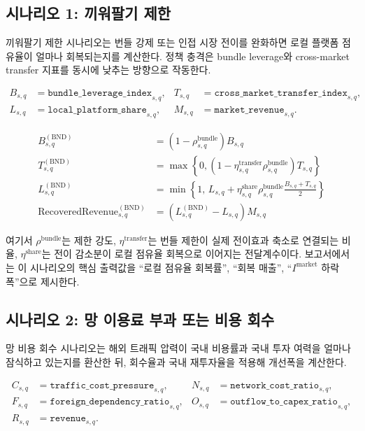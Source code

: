 \documentclass[11pt,a4paper]{report}
\begin{document}
\subsection{시나리오 1: 끼워팔기 제한}
끼워팔기 제한 시나리오는 번들 강제 또는 인접 시장 전이를 완화하면 로컬 플랫폼 점유율이 얼마나 회복되는지를 계산한다. 정책 충격은 bundle leverage와 cross-market transfer 지표를 동시에 낮추는 방향으로 작동한다.

\[
\begin{aligned}
B_{s,q} &= \texttt{bundle\_leverage\_index}_{s,q}, &
T_{s,q} &= \texttt{cross\_market\_transfer\_index}_{s,q}, \\
L_{s,q} &= \texttt{local\_platform\_share}_{s,q}, &
M_{s,q} &= \texttt{market\_revenue}_{s,q}.
\end{aligned}
\]

\begin{align}
B^{(\mathrm{BND})}_{s,q} &= \left(1-\rho^{\mathrm{bundle}}_{s,q}\right)B_{s,q} \\
T^{(\mathrm{BND})}_{s,q} &= \max\!\left\{0,\left(1-\eta^{\mathrm{transfer}}_{s,q}\rho^{\mathrm{bundle}}_{s,q}\right)T_{s,q}\right\} \\
L^{(\mathrm{BND})}_{s,q} &= \min\!\left\{1,\,
L_{s,q} + \eta^{\mathrm{share}}_{s,q}\rho^{\mathrm{bundle}}_{s,q}
\frac{B_{s,q}+T_{s,q}}{2}\right\} \\
\mathrm{RecoveredRevenue}^{(\mathrm{BND})}_{s,q} &= \left(L^{(\mathrm{BND})}_{s,q}-L_{s,q}\right)M_{s,q}
\end{align}

여기서 $\rho^{\mathrm{bundle}}$는 제한 강도, $\eta^{\mathrm{transfer}}$는 번들 제한이 실제 전이효과 축소로 연결되는 비율, $\eta^{\mathrm{share}}$는 전이 감소분이 로컬 점유율 회복으로 이어지는 전달계수이다. 보고서에서는 이 시나리오의 핵심 출력값을 ``로컬 점유율 회복률'', ``회복 매출'', ``$I^{\mathrm{market}}$ 하락폭''으로 제시한다.

\subsection{시나리오 2: 망 이용료 부과 또는 비용 회수}
망 비용 회수 시나리오는 해외 트래픽 압력이 국내 비용률과 국내 투자 여력을 얼마나 잠식하고 있는지를 환산한 뒤, 회수율과 국내 재투자율을 적용해 개선폭을 계산한다.

\[
\begin{aligned}
C_{s,q} &= \texttt{traffic\_cost\_pressure}_{s,q}, &
N_{s,q} &= \texttt{network\_cost\_ratio}_{s,q}, \\
F_{s,q} &= \texttt{foreign\_dependency\_ratio}_{s,q}, &
O_{s,q} &= \texttt{outflow\_to\_capex\_ratio}_{s,q}, \\
R_{s,q} &= \texttt{revenue}_{s,q}. &&
\end{aligned}
\]
\end{document}
